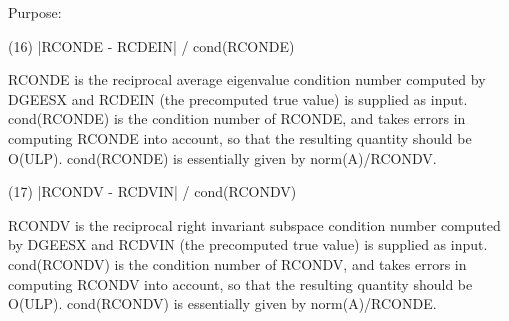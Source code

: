 \begin{DoxyParagraph}{Purpose\+: }
\begin{DoxyVerb}
   (16)  |RCONDE - RCDEIN| / cond(RCONDE)

      RCONDE is the reciprocal average eigenvalue condition number
      computed by DGEESX and RCDEIN (the precomputed true value)
      is supplied as input.  cond(RCONDE) is the condition number
      of RCONDE, and takes errors in computing RCONDE into account,
      so that the resulting quantity should be O(ULP). cond(RCONDE)
      is essentially given by norm(A)/RCONDV.

   (17)  |RCONDV - RCDVIN| / cond(RCONDV)

      RCONDV is the reciprocal right invariant subspace condition
      number computed by DGEESX and RCDVIN (the precomputed true
      value) is supplied as input. cond(RCONDV) is the condition
      number of RCONDV, and takes errors in computing RCONDV into
      account, so that the resulting quantity should be O(ULP).
      cond(RCONDV) is essentially given by norm(A)/RCONDE.\end{DoxyVerb}
 
\end{DoxyParagraph}

